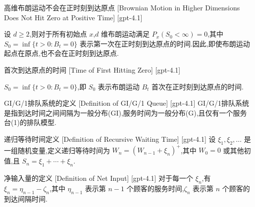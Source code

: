 \documentclass[UTF8]{ctexart}
\begin{document}
    
    
    \begin{ppt}
        {高维布朗运动不会在正时刻到达原点}
        [Brownian Motion in Higher Dimensions Does Not Hit Zero at Positive Time]
        [gpt-4.1]
        
设 $d \geq 2$,则对于所有初始点 $x$,$d$ 维布朗运动满足 $P_x(S_0 < \infty) = 0$,其中 $S_0 = \inf\{ t > 0 : B_t = 0 \}$ 表示第一次在正时刻到达原点的时间.因此,即使布朗运动起点在原点,也不会在正时刻到达原点.

    \end{ppt}
    
    
    
    \begin{dfn}
        {首次到达原点的时间}
        [Time of First Hitting Zero]
        [gpt-4.1]
        
$S_0 = \inf\{ t > 0 : B_t = 0 \}$,即 $S_0$ 表示布朗运动 $B_t$ 首次在正时刻到达原点的时间.

    \end{dfn}
    
    
    
    \begin{dfn}
        {GI/G/1排队系统的定义}
        [Definition of GI/G/1 Queue]
        [gpt-4.1]
        GI/G/1排队系统是指到达时间之间间隔为一般分布(GI),服务时间为一般分布(G),且仅有一个服务台(1)的排队模型.
    \end{dfn}
    
    
    
    \begin{dfn}
        {递归等待时间定义}
        [Definition of Recursive Waiting Time]
        [gpt-4.1]
        设 $\xi_1, \xi_2, \ldots$ 是一组随机变量,定义递归等待时间为 $W_n = (W_{n-1} + \xi_n)^+$,其中 $W_0=0$ 或其他初值,且 $S_n = \xi_1 + \cdots + \xi_n$.
    \end{dfn}
    
    
    
    \begin{dfn}
        {净输入量的定义}
        [Definition of Net Input]
        [gpt-4.1]
        对于每一个 $\xi_n$,有 $\xi_n = \eta_{n-1} - \zeta_n$,其中 $\eta_{n-1}$ 表示第 $n-1$ 个顾客的服务时间,$\zeta_n$ 表示第 $n$ 个顾客的到达间隔时间.
    \end{dfn}
    
\end{document}

